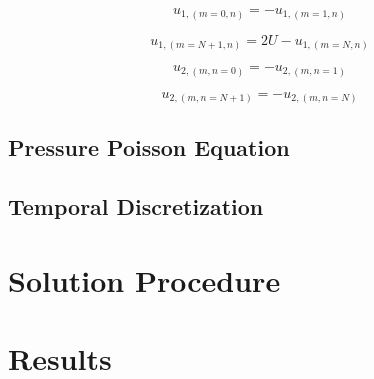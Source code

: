 \documentclass[10pt, letterpaper]{article}
\begin{document}
\begin{equation}
  u_{1,(m = 0,n)} = -u_{1,(m = 1, n)}
  \label{eq:BC_u1_bot}
\end{equation}

\begin{equation}
  u_{1,(m = N+1,n)} = 2U-u_{1,(m = N, n)}
  \label{eq:BC_u1_top}
\end{equation}

\begin{equation}
  u_{2,(m,n=0)} = -u_{2,(m, n=1)}
  \label{eq:BC_u2_left}
\end{equation}

\begin{equation}
  u_{2,(m,n=N+1)} = -u_{2,(m, n=N)}
  \label{eq:BC_u2_right}
\end{equation}


\subsection{Pressure Poisson Equation}

\subsection{Temporal Discretization}

\section{Solution Procedure}

\section{Results}

\printbibliography{}
\end{document}
